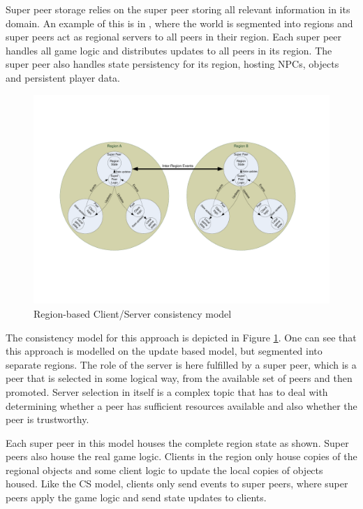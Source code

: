 \documentclass[journal,oneside,a4paper,onecolumn]{IEEEtran}
\begin{document}
Super peer storage relies on the super peer storing all relevant information in its domain. An example of this is in \cite{knutsson_p2p_first}, where the world is segmented into regions and super peers act as regional servers to all peers in their region. Each super peer handles all game logic and distributes updates to all peers in its region. The super peer also handles state persistency for its region, hosting NPCs, objects and persistent player data.

\begin{figure}[htbp]
 \centering
 \includegraphics[clip=true, viewport=2cm 5cm 27cm 16.5cm, width=\columnwidth]{region_based_CS_CM}
 \caption{Region-based Client/Server consistency model}
 \label{fig_cs_region_cm}
\end{figure}
%
The consistency model for this approach is depicted in Figure \ref{fig_cs_region_cm}. One can see that this approach is modelled on the update based model, but segmented into separate regions. The role of the server is here fulfilled by a super peer, which is a peer that is selected in some logical way, from the available set of peers and then promoted. Server selection in itself is a complex topic that has to deal with determining whether a peer has sufficient resources available and also whether the peer is trustworthy.

Each super peer in this model houses the complete region state as shown. Super peers also house the real game logic. Clients in the region only house copies of the regional objects and some client logic to update the local copies of objects housed. Like the \ac{CS} model, clients only send events to super peers, where super peers apply the game logic and send state updates to clients.
\end{document}
